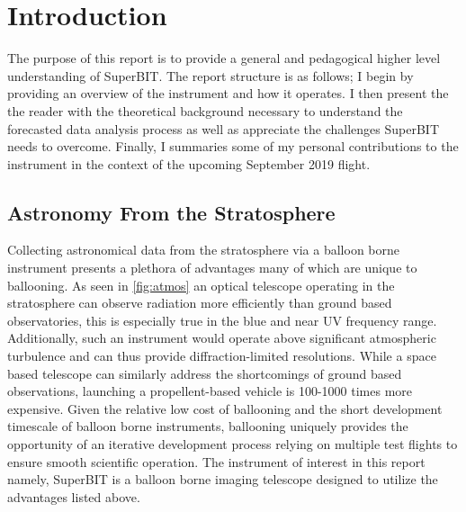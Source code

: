 \chapter{Introduction}

The purpose of this report is to provide a general and pedagogical higher level understanding of SuperBIT. The report structure is as follows; I begin by providing an overview of the instrument and how it operates. I then present the the reader with the theoretical background necessary to understand the forecasted data analysis process as well as appreciate the challenges SuperBIT needs to overcome. Finally, I summaries some of my personal contributions to the instrument in the context of the upcoming September 2019 flight. 
  

\section{Astronomy From the Stratosphere}
Collecting astronomical data from the stratosphere via a balloon borne instrument presents a plethora of advantages many of which are unique to ballooning. As seen in \autoref{fig:atmos} an optical telescope operating in the stratosphere can observe radiation more efficiently than ground based observatories, this is especially true in the blue and near UV frequency range. Additionally, such an instrument would operate above significant atmospheric turbulence and can thus provide diffraction-limited resolutions. While a space based telescope can similarly address the shortcomings of ground based observations, launching a propellent-based vehicle is 100-1000 times more expensive. Given the relative low cost of ballooning and the short development timescale of balloon borne instruments, ballooning uniquely provides the opportunity of an iterative development process relying on multiple test flights to ensure smooth scientific operation. The instrument of interest in this report namely, SuperBIT is a balloon borne imaging telescope designed to utilize the advantages listed above.

